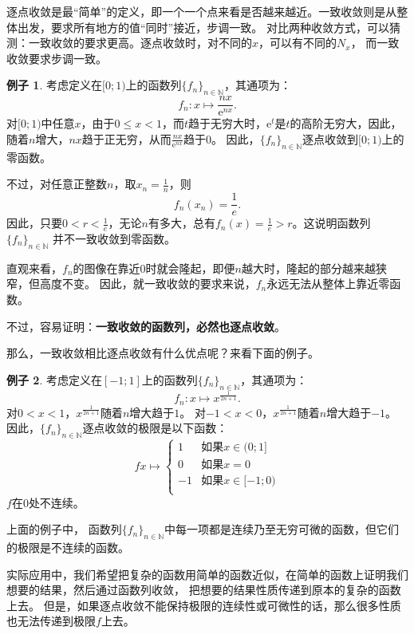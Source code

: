 \documentclass[12pt,UTF8]{ctexbook}
\theoremstyle{definition}
\newtheorem{ex}{例子}[section]
\theoremstyle{plain}
\begin{document}
逐点收敛是最“简单”的定义，即一个一个点来看是否越来越近。一致收敛则是从整体出发，要求所有地方的值“同时”接近，步调一致。
对比两种收敛方式，可以猜测：一致收敛的要求更高。逐点收敛时，对不同的$x$，可以有不同的$N_x$，
而一致收敛要求步调一致。

\begin{ex}
    考虑定义在$[0;1)$上的函数列$\{f_n\}_{n\in\mathbb{N}}$，其通项为：
    $$ f_n: x \mapsto \frac{nx}{\mathrm{e}^{nx}}. $$
    对$[0;1)$中任意$x$，由于$0\leqslant x<1$，而$t$趋于无穷大时，$\mathrm{e}^t$是$t$的高阶无穷大，因此，随着$n$增大，$nx$趋于正无穷，从而$\frac{nx}{\mathrm{e}^{nx}}$趋于$0$。
    因此，$\{f_n\}_{n\in\mathbb{N}}$逐点收敛到$[0;1)$上的零函数。

    不过，对任意正整数$n$，取$x_n = \frac{1}{n}$，则
    $$f_n(x_n) = \frac{1}{e}.$$
    因此，只要$0<r <\frac{1}{e}$，无论$n$有多大，总有$f_n(x) = \frac{1}{e} > r$。这说明函数列$\{f_n\}_{n\in\mathbb{N}}$
    并不一致收敛到零函数。
    
    直观来看，$f_n$的图像在靠近$0$时就会隆起，即便$n$越大时，隆起的部分越来越狭窄，但高度不变。
    因此，就一致收敛的要求来说，$f_n$永远无法从整体上靠近零函数。

\end{ex}

不过，容易证明：\textbf{一致收敛的函数列，必然也逐点收敛}。

那么，一致收敛相比逐点收敛有什么优点呢？来看下面的例子。

\begin{ex}
    考虑定义在$[-1;1]$上的函数列$\{f_n\}_{n\in\mathbb{N}}$，其通项为：
    $$ f_n: x \mapsto x^{\frac{1}{2n+1}}. $$
    对$0<x<1$，$x^{\frac{1}{2n+1}}$随着$n$增大趋于$1$。
    对$-1<x<0$，$x^{\frac{1}{2n+1}}$随着$n$增大趋于$-1$。
    因此，$\{f_n\}_{n\in\mathbb{N}}$逐点收敛的极限是以下函数：
    $$
    f x\mapsto \left\{
        \begin{array}{ll}
            1 & \mbox{如果} x \in (0; 1] \\
            0 & \mbox{如果} x = 0 \\
            -1 & \mbox{如果} x \in [-1; 0) \\
        \end{array}
    \right.
    $$
    $f$在$0$处不连续。
\end{ex}
上面的例子中，
函数列$\{f_n\}_{n\in\mathbb{N}}$中每一项都是连续乃至无穷可微的函数，但它们的极限是不连续的函数。

实际应用中，我们希望把复杂的函数用简单的函数近似，在简单的函数上证明我们想要的结果，然后通过函数列收敛，
把想要的结果性质传递到原本的复杂的函数上去。
但是，如果逐点收敛不能保持极限的连续性或可微性的话，那么很多性质也无法传递到极限$f$上去。
\end{document}
